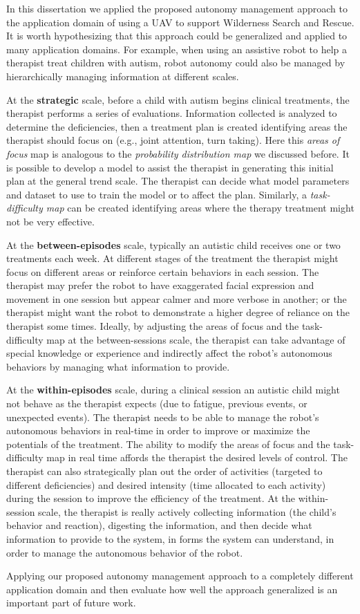 In this dissertation we applied the proposed autonomy management approach to the application domain of using a UAV to support Wilderness Search and Rescue. It is worth hypothesizing that this approach could be generalized and applied to many application domains. For example, when using an assistive robot to help a therapist treat children with autism, robot autonomy could also be managed by hierarchically managing information at different scales. 

At the \textbf{strategic} scale, before a child with autism begins clinical treatments, the therapist performs a series of evaluations. Information collected is analyzed to determine the deficiencies, then a treatment plan is created identifying areas the therapist should focus on (e.g., joint attention, turn taking). Here this 
\textit{areas of focus} map is analogous to the \textit{probability distribution map} we discussed before. It is possible to develop a model to assist the therapist in generating this initial plan at the general trend scale. The therapist can decide what model parameters and dataset to use to train the model or to affect the plan. Similarly, a \textit{task-difficulty map} can be created identifying areas where the therapy treatment might not be very effective.

At the \textbf{between-episodes} scale, typically an autistic child receives one or two treatments each week. At different stages of the treatment the therapist might focus on different areas or reinforce certain behaviors in each session. The therapist may prefer the robot to have exaggerated facial expression and movement in one session but appear calmer and more verbose in another; or the therapist might want the robot to demonstrate a higher degree of reliance on the therapist some times. Ideally, by adjusting the areas of focus and the task-difficulty map at the between-sessions scale, the therapist can take advantage of special knowledge or experience and indirectly affect the robot's autonomous behaviors by managing what information to provide.

At the \textbf{within-episodes} scale, during a clinical session an autistic child might not behave as the therapist expects (due to fatigue, previous events, or unexpected events). The therapist needs to be able to manage the robot's autonomous behaviors in real-time in order to improve or maximize the potentials of the treatment. The ability to modify the areas of focus and the task-difficulty map in real time affords the therapist the desired levels of control. The therapist can also strategically plan out the order of activities (targeted to different deficiencies) and desired intensity (time allocated to each activity) during the session to improve the efficiency of the treatment. At the within-session scale, the therapist is really actively collecting information (the child's behavior and reaction), digesting the information, and then decide what information to provide to the system, in forms the system can understand, in order to manage the autonomous behavior of the robot.

Applying our proposed autonomy management approach to a completely different application domain and then evaluate how well the approach generalized is an important part of future work.